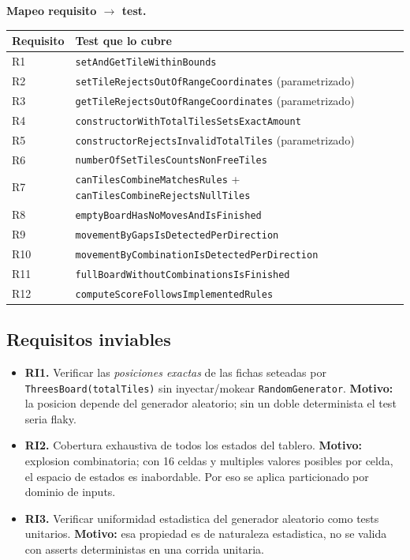 \documentclass[12pt,a4paper]{article}
\begin{document}
\textbf{Mapeo requisito $\to$ test.}

\begin{center}
\begin{tabular}{ll}
\toprule
Requisito & Test que lo cubre \\
\midrule
R1  & \texttt{setAndGetTileWithinBounds} \\
R2  & \texttt{setTileRejectsOutOfRangeCoordinates} (parametrizado) \\
R3  & \texttt{getTileRejectsOutOfRangeCoordinates} (parametrizado) \\
R4  & \texttt{constructorWithTotalTilesSetsExactAmount} \\
R5  & \texttt{constructorRejectsInvalidTotalTiles} (parametrizado) \\
R6  & \texttt{numberOfSetTilesCountsNonFreeTiles} \\
R7  & \texttt{canTilesCombineMatchesRules} + \texttt{canTilesCombineRejectsNullTiles} \\
R8  & \texttt{emptyBoardHasNoMovesAndIsFinished} \\
R9  & \texttt{movementByGapsIsDetectedPerDirection} \\
R10 & \texttt{movementByCombinationIsDetectedPerDirection} \\
R11 & \texttt{fullBoardWithoutCombinationsIsFinished} \\
R12 & \texttt{computeScoreFollowsImplementedRules} \\
\bottomrule
\end{tabular}
\end{center}

\subsection{Requisitos inviables}

\begin{itemize}
  \item \textbf{RI1.} Verificar las \emph{posiciones exactas} de las fichas seteadas por
  \texttt{ThreesBoard(totalTiles)} sin inyectar/mokear \texttt{RandomGenerator}.
  \textbf{Motivo:} la posicion depende del generador aleatorio; sin un doble determinista
  el test seria flaky.
  \item \textbf{RI2.} Cobertura exhaustiva de todos los estados del tablero.
  \textbf{Motivo:} explosion combinatoria; con 16 celdas y multiples valores posibles
  por celda, el espacio de estados es inabordable. Por eso se aplica particionado por
  dominio de inputs.
  \item \textbf{RI3.} Verificar uniformidad estadistica del generador aleatorio como tests
  unitarios.
  \textbf{Motivo:} esa propiedad es de naturaleza estadistica, no se valida con asserts
  deterministas en una corrida unitaria.
\end{itemize}
\end{document}
